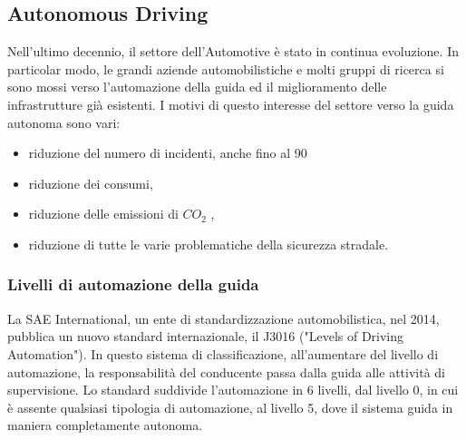 \documentclass[14pt]{extarticle}
\begin{document}
\subsection{Autonomous Driving}
Nell'ultimo decennio, il settore dell'Automotive è stato in continua evoluzione. In particolar modo, le grandi aziende automobilistiche e molti gruppi di ricerca si sono mossi verso l'automazione della guida ed
il miglioramento delle infrastrutture già esistenti. I motivi di questo
interesse del settore verso la guida autonoma sono vari:
\begin{itemize}
\item riduzione del numero di incidenti, anche fino al 90%
\item  riduzione dei consumi,
\item  riduzione delle emissioni di $CO_{2}$ ,
\item  riduzione di tutte le varie problematiche della sicurezza
stradale.
\end{itemize}

\subsubsection{Livelli di automazione della guida}
La SAE International, un ente di standardizzazione automobilistica,  nel 2014, pubblica un nuovo standard internazionale, il J3016 ("Levels of Driving Automation").
In questo sistema di classificazione, all'aumentare del livello di automazione, la responsabilità del conducente passa dalla guida alle attività di
supervisione.
Lo standard suddivide l'automazione in 6 livelli, dal livello 0, in cui è assente qualsiasi tipologia di automazione, al livello 5, dove il sistema guida in maniera completamente autonoma.
\end{document}
